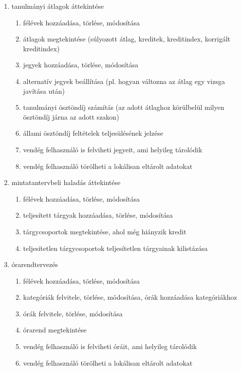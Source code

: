 \documentclass[a4paper,12pt]{report}
\begin{document}
\begin{enumerate}
    \item tanulmányi átlagok áttekintése
    \begin{enumerate}
        \item félévek hozzáadása, törlése, módosítása
        \item átlagok megtekintése (súlyozott átlag, kreditek, kreditindex, korrigált kreditindex)
        \item jegyek hozzáadása, törlése, módosítása
        \item alternatív jegyek beállítása (pl. hogyan változna az átlag egy vizsga javítása után)
        \item tanulmányi ösztöndíj számítás (az adott átlaghoz körülbelül milyen ösztöndíj járna az adott szakon)
        \item állami ösztöndíj feltételek teljesülésének jelzése
        \item vendég felhasználó is felviheti jegyeit, ami helyileg tárolódik
        \item vendég felhasználó törölheti a lokálisan eltárolt adatokat
    \end{enumerate}
    \item mintatantervbeli haladás áttekintése
    \begin{enumerate}
        \item félévek hozzáadása, törlése, módosítása
        \item teljesített tárgyak hozzáadása, törlése, módosítása
        \item tárgycsoportok megtekintése, ahol még hiányzik kredit
        \item teljesítetlen tárgycsoportok teljesítetlen tárgyainak kilistázása
    \end{enumerate}
    \item órarendtervezés
    \begin{enumerate}
        \item félévek hozzáadása, törlése, módosítása
        \item kategóriák felvitele, törlése, módosítása, órák hozzáadása kategóriákhoz
        \item órák felvitele, törlése, módosítása
        \item órarend megtekintése
        \item vendég felhasználó is felviheti óráit, ami helyileg tárolódik
        \item vendég felhasználó törölheti a lokálisan eltárolt adatokat
    \end{enumerate}

\end{enumerate}
\end{document}
